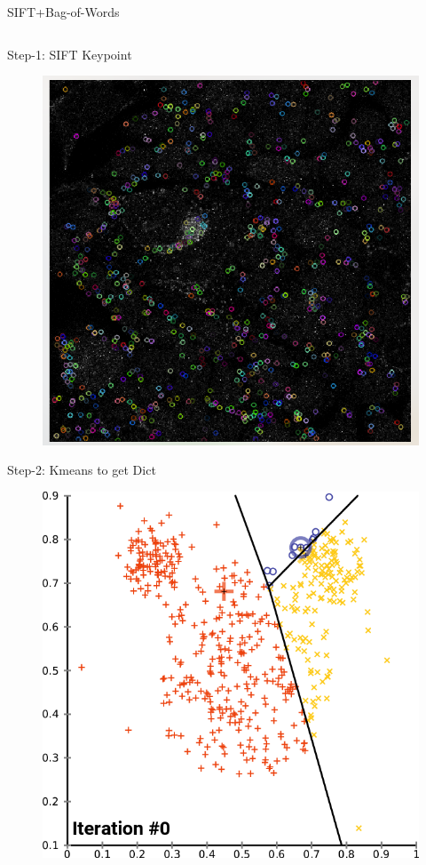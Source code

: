 \documentclass[unknownkeysallowed]{beamer}
\begin{document}
	\begin{frame}{SIFT+Bag-of-Words\cite{al2016facial,hosmer2013applied}}
	\begin{columns}
	\begin{column}{0.45\paperwidth}
	Step-1: SIFT Keypoint
	\begin{figure}\includegraphics[width=0.25\paperwidth,height=0.25\paperheight]{images/sift_demo}
	\end{figure}
	Step-2: Kmeans to get Dict\cite{basu2002semi}
	\begin{figure}\includegraphics[width=0.3\paperwidth,height=0.3\paperheight]{images/k_means_convergence}

\end{figure}
\end{column}
\end{columns}
\end{frame}
\end{document}
